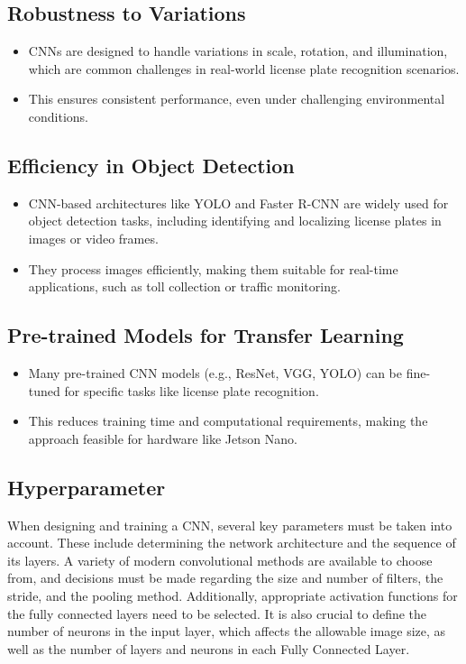 \subsection*{Robustness to Variations}
\begin{itemize}
	\item CNNs are designed to handle variations in scale, rotation, and illumination, which are common challenges in real-world license plate recognition scenarios.
	\item This ensures consistent performance, even under challenging environmental conditions.
\end{itemize}

\subsection*{Efficiency in Object Detection}
\begin{itemize}
	\item CNN-based architectures like YOLO and Faster R-CNN are widely used for object detection tasks, including identifying and localizing license plates in images or video frames.
	\item They process images efficiently, making them suitable for real-time applications, such as toll collection or traffic monitoring.
\end{itemize}

\subsection*{Pre-trained Models for Transfer Learning}
\begin{itemize}
	\item Many pre-trained CNN models (e.g., ResNet, VGG, YOLO) can be fine-tuned for specific tasks like license plate recognition.
	\item This reduces training time and computational requirements, making the approach feasible for hardware like Jetson Nano.
\end{itemize}



\subsection{Hyperparameter}

When designing and training a CNN, several key parameters must be taken into account. These include determining the network architecture and the sequence of its layers. A variety of modern convolutional methods are available to choose from, and decisions must be made regarding the size and number of filters, the stride, and the pooling method. Additionally, appropriate activation functions for the fully connected layers need to be selected. It is also crucial to define the number of neurons in the input layer, which affects the allowable image size, as well as the number of layers and neurons in each Fully Connected Layer.

